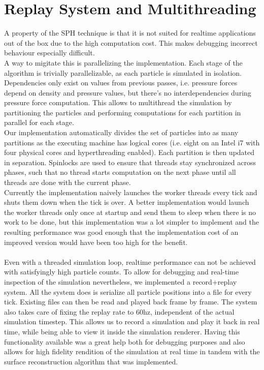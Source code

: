 \documentclass{ACGSeminar}
\begin{document}
\section{Replay System and Multithreading}
A property of the SPH technique is that it is not suited for realtime applications out of the box due to the high computation cost. This makes debugging incorrect behaviour especially difficult. \\
A way to migitate this is parallelizing the implementation. Each stage of the algorithm is trivially parallelizable, as each particle is simulated in isolation. Dependencies only exist on values from previous passes, i.e. pressure forces depend on density and pressure values, but there's no interdependencies during pressure force computation.
This allows to multithread the simulation by partitioning the particles and performing computations for each partition in parallel for each stage.\\
Our implementation automatically divides the set of particles into as many partitions as the executing machine has logical cores (i.e. eight on an Intel i7 with four physical cores and hyperthreading enabled).
Each partition is then updated in separation. Spinlocks are used to ensure that threads stay synchronized across phases, such that no thread starts computation on the next phase until all threads are done with the current phase.\\
Currently the implementation naively launches the worker threads every tick and shuts them down when the tick is over. A better implementation would launch the worker threads only once at startup and send them to sleep when there is no work to be done, but this implementation was a lot simpler to implement and the resulting performance was good enough that the implementation cost of an improved version would have been too high for the benefit.\\
\\
Even with a threaded simulation loop, realtime performance can not be achieved with satisfyingly high particle counts. To allow for debugging and real-time inspection of the simulation nevertheless, we implemented a record+replay system. All the system does is serialize all particle positions into a file for every tick. Existing files can then be read and played back frame by frame. The system also takes care of fixing the replay rate to 60hz, independent of the actual simulation timestep. 
This allows us to record a simulation and play it back in real time, while being able to view it inside the simulation renderer. Having this functionality available was a great help both for debugging purposes and also allows for high fidelity rendition of the simulation at real time in tandem with the surface reconstruction algorithm that was implemented.\\
\end{document}
